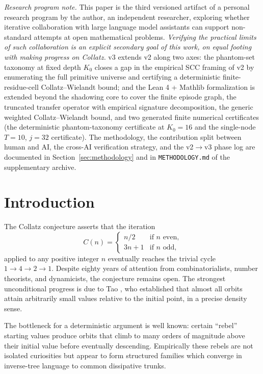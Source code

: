\documentclass[11pt,a4paper]{article}
\theoremstyle{definition}
\begin{document}
\noindent\textit{Research program note.} This paper is the third
versioned artifact of a personal research program by the author, an
independent researcher, exploring whether iterative collaboration with
large language model assistants can support non-standard attempts at
open mathematical problems. \emph{Verifying the practical limits of
such collaboration is an explicit secondary goal of this work, on
equal footing with making progress on Collatz.} v3 extends v2 along
two axes: the phantom-set taxonomy at fixed depth $K_0$ closes a gap
in the empirical SCC framing of v2 by enumerating the full primitive
universe and certifying a deterministic finite-residue-cell
Collatz--Wielandt bound; and the Lean 4 + Mathlib formalization
is extended beyond the shadowing core to cover the finite episode
graph, the truncated transfer operator with empirical signature
decomposition, the generic weighted Collatz--Wielandt bound, and two
generated finite numerical certificates (the deterministic
phantom-taxonomy certificate at $K_0 = 16$ and the single-node
$T = 10$, $j = 32$ certificate). The methodology, the contribution
split between human and AI, the cross-AI verification strategy, and
the v2$\to$v3 phase log are documented in
Section~\ref{sec:methodology} and in \texttt{METHODOLOGY.md} of the
supplementary archive.
\medskip

\tableofcontents

\section{Introduction}
\label{sec:intro}

The Collatz conjecture asserts that the iteration
\[
C(n) =
\begin{cases}
n/2 & \text{if } n \text{ even,} \\
3n+1 & \text{if } n \text{ odd,}
\end{cases}
\]
applied to any positive integer $n$ eventually reaches the trivial
cycle $1 \to 4 \to 2 \to 1$. Despite eighty years of attention from
combinatorialists, number theorists, and dynamicists, the conjecture
remains open. The strongest unconditional progress is due to Tao
\cite{tao2019}, who established that almost all orbits attain
arbitrarily small values relative to the initial point, in a precise
density sense.

The bottleneck for a deterministic argument is well known: certain
``rebel'' starting values produce orbits that climb to many orders
of magnitude above their initial value before eventually descending.
Empirically these rebels are not isolated curiosities but appear to
form structured families which converge in inverse-tree language to
common dissipative trunks.
\end{document}
